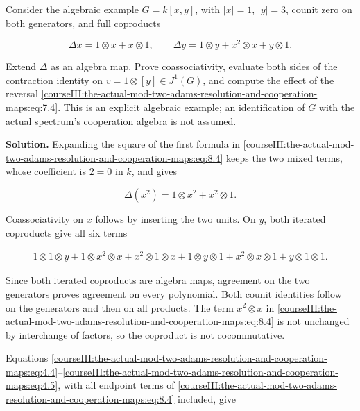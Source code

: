 \label{courseIII:actual-resolution:8.2}

Consider the algebraic example \(G=k[x,y]\), with \(|x|=1\), \(|y|=3\), counit zero on both generators, and full coproducts

\begin{equation}
\Delta x=1\otimes x+x\otimes1,\qquad
 \Delta y=1\otimes y+x^2\otimes x+y\otimes1.
 \label{courseIII:the-actual-mod-two-adams-resolution-and-cooperation-maps:eq:8.4}
\end{equation}

Extend \(\Delta\) as an algebra map. Prove coassociativity, evaluate both sides of the contraction identity on \(v=1\otimes[y]\in J^1(G)\), and compute the effect of the reversal \eqref{courseIII:the-actual-mod-two-adams-resolution-and-cooperation-maps:eq:7.4}. This is an explicit algebraic example; an identification of \(G\) with the actual spectrum's cooperation algebra is not assumed.

\textbf{Solution.} Expanding the square of the first formula in \eqref{courseIII:the-actual-mod-two-adams-resolution-and-cooperation-maps:eq:8.4} keeps the two mixed terms, whose coefficient is \(2=0\) in \(k\), and gives

\begin{equation}
\Delta(x^2)=1\otimes x^2+x^2\otimes1.
 \label{courseIII:the-actual-mod-two-adams-resolution-and-cooperation-maps:eq:8.5}
\end{equation}

Coassociativity on \(x\) follows by inserting the two units. On \(y\), both iterated coproducts give all six terms

\begin{equation}
\begin{aligned}
 1\otimes1\otimes y
 +1\otimes x^2\otimes x
 +x^2\otimes1\otimes x
 +1\otimes y\otimes1
 +x^2\otimes x\otimes1
 +y\otimes1\otimes1.
 \end{aligned}
 \label{courseIII:the-actual-mod-two-adams-resolution-and-cooperation-maps:eq:8.6}
\end{equation}

Since both iterated coproducts are algebra maps, agreement on the two generators proves agreement on every polynomial. Both counit identities follow on the generators and then on all products. The term \(x^2\otimes x\) in \eqref{courseIII:the-actual-mod-two-adams-resolution-and-cooperation-maps:eq:8.4} is not unchanged by interchange of factors, so the coproduct is not cocommutative.

Equations \eqref{courseIII:the-actual-mod-two-adams-resolution-and-cooperation-maps:eq:4.4}--\eqref{courseIII:the-actual-mod-two-adams-resolution-and-cooperation-maps:eq:4.5}, with all endpoint terms of \eqref{courseIII:the-actual-mod-two-adams-resolution-and-cooperation-maps:eq:8.4} included, give

